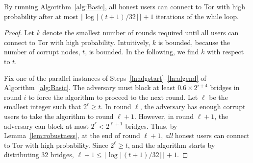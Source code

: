 \documentclass{llncs}
\newcommand{\sfsize}{\fontsize{0.73\baselineskip}{0.73\baselineskip}\selectfont}
\newcommand{\sans}[1]{\textsf{\sfsize \mbox{#1}}}
\newcommand{\sansb}[1]{\textbf{\sans{\mbox{#1}}}}
\begin{document}
\begin{lemma}[\sansb{Latency}] \label{lem:NumIterationsBasic}
	By running Algorithm~\ref{alg:Basic}, all honest users can connect to Tor with high probability after at most ${\lceil \log{\lceil (t+1)/32 \rceil} \rceil + 1}$ iterations of the while loop.
\end{lemma}
\begin{proof}
	Let $k$ denote the smallest number of rounds required until all users can connect to Tor with high probability. Intuitively, $k$ is  bounded, because the number of corrupt nodes, $t$, is bounded. In the following, we find $k$ with respect to $t$. 
	
	Fix one of the parallel instances of Steps~\ref{ln:algstart}--\ref{ln:algend} of Algorithm~\ref{alg:Basic}.  The adversary must block at least ${0.6 \times 2^{i+4}}$ bridges in round $i$ to force the algorithm to proceed to the next round. Let $\ell$ be the smallest integer such that ${2^\ell \geq t}$. In round $\ell$, the adversary has enough corrupt users to take the algorithm to round ${\ell + 1}$. However, in round ${{\ell + 1}}$, the adversary can block at most ${2^\ell < 2^{\ell+1}}$ bridges.  Thus, by Lemma~\ref{lem:robustness}, at the end of round  $\ell+1$,  \emph{all} honest users can connect to Tor with high probability. Since ${2^\ell \geq t}$, and the algorithm starts by distributing 32 bridges, 
	$\ell+1 \leq \lceil \log{\lceil (t+1)/32 \rceil} \rceil + 1.$\end{proof}
\end{document}
